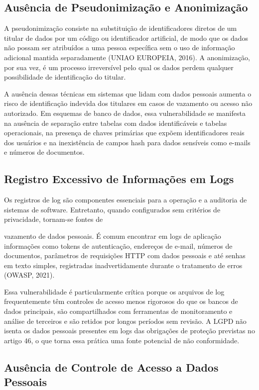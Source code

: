 \documentclass[oneside]{normas-utf-tex}
\begin{document}
\subsection{Ausência de Pseudonimização e Anonimização}

A pseudonimização consiste na substituição de identificadores diretos de um titular de dados por um código ou identificador artificial, de modo que os dados não possam ser atribuídos a uma pessoa específica sem o uso de informação adicional mantida separadamente (UNIAO EUROPEIA, 2016). A anonimização, por sua vez, é um processo irreversível pelo qual os dados perdem qualquer possibilidade de identificação do titular.

A ausência dessas técnicas em sistemas que lidam com dados pessoais aumenta o risco de identificação indevida dos titulares em casos de vazamento ou acesso não autorizado. Em esquemas de banco de dados, essa vulnerabilidade se manifesta na ausência de separação entre tabelas com dados identificáveis e tabelas operacionais, na presença de chaves primárias que expõem identificadores reais dos usuários e na inexistência de campos hash para dados sensíveis como e-mails e números de documentos.

\subsection{Registro Excessivo de Informações em Logs}

Os registros de log são componentes essenciais para a operação e a auditoria de sistemas de software. Entretanto, quando configurados sem critérios de privacidade, tornam-se fontes de

vazamento de dados pessoais. É comum encontrar em logs de aplicação informações como tokens de autenticação, endereços de e-mail, números de documentos, parâmetros de requisições HTTP com dados pessoais e até senhas em texto simples, registradas inadvertidamente durante o tratamento de erros (OWASP, 2021).

Essa vulnerabilidade é particularmente crítica porque os arquivos de log frequentemente têm controles de acesso menos rigorosos do que os bancos de dados principais, são compartilhados com ferramentas de monitoramento e análise de terceiros e são retidos por longos períodos sem revisão. A LGPD não isenta os dados pessoais presentes em logs das obrigações de proteção previstas no artigo 46, o que torna essa prática uma fonte potencial de não conformidade.

\subsection{Ausência de Controle de Acesso a Dados Pessoais}
\end{document}
